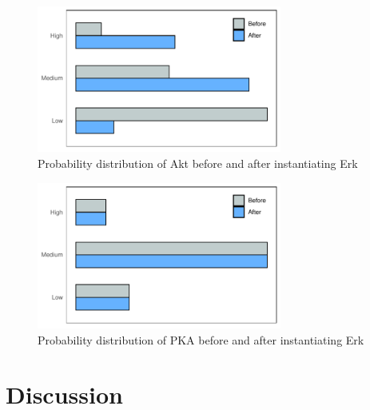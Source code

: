 \documentclass[twocol]{ametsoc}
\begin{document}
\begin{figure}[h]
 \centerline{\includegraphics[width = 19pc]{images/erk_akt.pdf}}
  \caption{Probability distribution of Akt before and after instantiating Erk}\label{akt}
\end{figure}

\begin{figure}[h]
 \centerline{\includegraphics[width = 19pc]{images/erk_pka.pdf}}
  \caption{Probability distribution of PKA before and after instantiating Erk}\label{pka}
\end{figure}

\hypertarget{discussion}{%
\section{Discussion}\label{discussion}}
\end{document}
